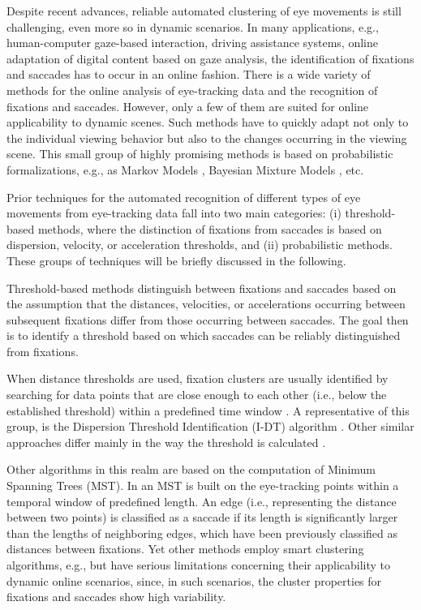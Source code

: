 \documentclass[preprint,12pt]{elsarticle}
\begin{document}
Despite recent advances, reliable automated clustering of eye movements is still challenging, even more so in dynamic scenarios.
In many applications, e.g., human-computer gaze-based interaction, driving assistance systems, online adaptation of digital content based on gaze analysis, the identification of fixations and saccades has to occur in an online fashion.
There is a wide variety of methods for the online analysis of eye-tracking data and the recognition of fixations and saccades.
However, only a few of them are suited for online applicability to dynamic scenes.
Such methods have to quickly adapt not only to the individual viewing behavior but also to the changes occurring in the viewing scene.
This small group of highly promising methods is based on probabilistic formalizations, e.g.,
as Markov Models \cite{Salvucci:2000:IFS:355017.355028, Komogortsev2013},
Bayesian Mixture Models \cite{Tafaj:2012:BOC:2168556.2168617}, etc.

Prior techniques for the automated recognition of different types of eye movements from eye-tracking data fall into two main categories:
(i) threshold-based methods, where the distinction of fixations from saccades is based on dispersion, velocity, or acceleration thresholds, and
(ii) probabilistic methods. These groups of techniques will be briefly discussed in the following.

Threshold-based methods distinguish between fixations and saccades based on the assumption that the distances, velocities, or accelerations occurring between subsequent fixations differ from those occurring between saccades.
The goal then is to identify a threshold based on which saccades can be reliably distinguished from fixations.

When distance thresholds are used, fixation clusters are usually identified by searching for data points that are close enough to each other (i.e., below the established threshold) within a predefined time window \cite{holmqvist-eye-tracking-a-comprehensive-guide-to-methods-and-measures}.
A representative of this group, is the Dispersion Threshold Identification (I-DT) algorithm \cite{Salvucci:2000:IFS:355017.355028}.
Other similar approaches differ mainly in the way the threshold is calculated \cite{Blignaut2009, Shic:2008:IFM:1344471.1344500}.

Other algorithms in this realm are based on the computation of Minimum Spanning Trees (MST).
In \cite{Salvucci:2000:IFS:355017.355028} an MST is built on the eye-tracking points within a temporal window of predefined length.
An edge (i.e., representing the distance between two points) is classified as a saccade if its length is significantly larger than the lengths of neighboring edges,
which have been previously classified as distances between fixations.
Yet other methods employ smart clustering algorithms, e.g., \cite{Santella:2004:RCE:968363.968368, Urruty:2007:DEF:1314303.1314308}
but have serious limitations concerning their applicability to dynamic online scenarios,
since, in such scenarios, the cluster properties for fixations and saccades show high variability.
\end{document}
